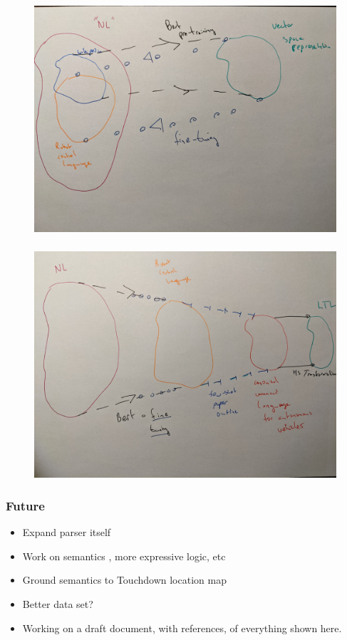 \documentclass{beamer}
\begin{document}
\begin{frame}
\frametitle{}
\begin{figure}
\hspace*{-3mm}%
   \includegraphics[width= \paperwidth]{pics/two.jpg}
\end{figure}
\end{frame}


\begin{frame}
\frametitle{}
\begin{figure}
\hspace*{-3mm}%
   \includegraphics[width= \paperwidth]{pics/three.jpg}
\end{figure}
\end{frame}

\begin{frame}
\frametitle{Future}

\begin{itemize} 
\item Expand parser itself
\item Work on semantics , more expressive logic, etc
\item Ground semantics to Touchdown location map
\item Better data set?
\item Working on a draft document, with references, of everything shown here.
\end{itemize} 

\end{frame}
\end{document}
